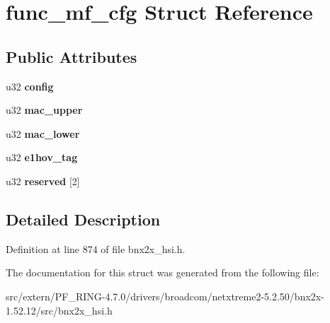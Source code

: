 \hypertarget{structfunc__mf__cfg}{
\section{func\_\-mf\_\-cfg Struct Reference}
\label{structfunc__mf__cfg}
}
\subsection*{Public Attributes}
\begin{DoxyCompactItemize}
\item 
\hypertarget{structfunc__mf__cfg_af205f0ee5c8e09dd2eafb6d23f82d650}{
u32 {\bfseries config}}
\label{structfunc__mf__cfg_af205f0ee5c8e09dd2eafb6d23f82d650}

\item 
\hypertarget{structfunc__mf__cfg_aece3127d1a24ca093c32e8bd7c08a35b}{
u32 {\bfseries mac\_\-upper}}
\label{structfunc__mf__cfg_aece3127d1a24ca093c32e8bd7c08a35b}

\item 
\hypertarget{structfunc__mf__cfg_a506b192a98a24cb04ef913b965d9f177}{
u32 {\bfseries mac\_\-lower}}
\label{structfunc__mf__cfg_a506b192a98a24cb04ef913b965d9f177}

\item 
\hypertarget{structfunc__mf__cfg_a02c62c52ed65da2de1a17e9ae22cdcc6}{
u32 {\bfseries e1hov\_\-tag}}
\label{structfunc__mf__cfg_a02c62c52ed65da2de1a17e9ae22cdcc6}

\item 
\hypertarget{structfunc__mf__cfg_a33bcf99bb2a760de2ec0924c0a15dcda}{
u32 {\bfseries reserved} \mbox{[}2\mbox{]}}
\label{structfunc__mf__cfg_a33bcf99bb2a760de2ec0924c0a15dcda}

\end{DoxyCompactItemize}


\subsection{Detailed Description}


Definition at line 874 of file bnx2x\_\-hsi.h.



The documentation for this struct was generated from the following file:\begin{DoxyCompactItemize}
\item 
src/extern/PF\_\-RING-\/4.7.0/drivers/broadcom/netxtreme2-\/5.2.50/bnx2x-\/1.52.12/src/bnx2x\_\-hsi.h\end{DoxyCompactItemize}
